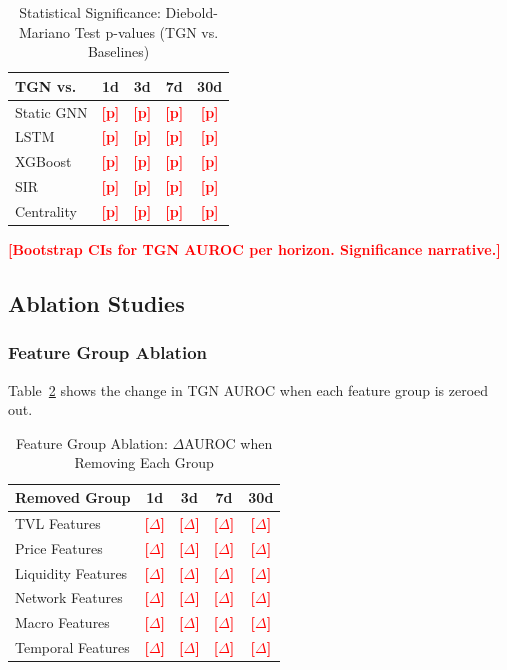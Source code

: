 \documentclass[journal]{IEEEtran}
\newcommand{\TODO}[1]{\textcolor{red}{\textbf{[#1]}}}
\begin{document}
\begin{table}[!t]
\caption{Statistical Significance: Diebold-Mariano Test p-values (TGN vs. Baselines)}
\label{tab:statistical}
\centering
\footnotesize
\begin{tabular}{lcccc}
\toprule
\textbf{TGN vs.} & \textbf{1d} & \textbf{3d} & \textbf{7d} & \textbf{30d} \\
\midrule
Static GNN & \TODO{p} & \TODO{p} & \TODO{p} & \TODO{p} \\
LSTM & \TODO{p} & \TODO{p} & \TODO{p} & \TODO{p} \\
XGBoost & \TODO{p} & \TODO{p} & \TODO{p} & \TODO{p} \\
SIR & \TODO{p} & \TODO{p} & \TODO{p} & \TODO{p} \\
Centrality & \TODO{p} & \TODO{p} & \TODO{p} & \TODO{p} \\
\bottomrule
\end{tabular}
\end{table}

\TODO{Bootstrap CIs for TGN AUROC per horizon. Significance narrative.}

\subsection{Ablation Studies}

\subsubsection{Feature Group Ablation}

Table~\ref{tab:ablation_feat} shows the change in TGN AUROC when each feature group is zeroed out.

\begin{table}[!t]
\caption{Feature Group Ablation: $\Delta$AUROC when Removing Each Group}
\label{tab:ablation_feat}
\centering
\footnotesize
\begin{tabular}{lcccc}
\toprule
\textbf{Removed Group} & \textbf{1d} & \textbf{3d} & \textbf{7d} & \textbf{30d} \\
\midrule
TVL Features & \TODO{$\Delta$} & \TODO{$\Delta$} & \TODO{$\Delta$} & \TODO{$\Delta$} \\
Price Features & \TODO{$\Delta$} & \TODO{$\Delta$} & \TODO{$\Delta$} & \TODO{$\Delta$} \\
Liquidity Features & \TODO{$\Delta$} & \TODO{$\Delta$} & \TODO{$\Delta$} & \TODO{$\Delta$} \\
Network Features & \TODO{$\Delta$} & \TODO{$\Delta$} & \TODO{$\Delta$} & \TODO{$\Delta$} \\
Macro Features & \TODO{$\Delta$} & \TODO{$\Delta$} & \TODO{$\Delta$} & \TODO{$\Delta$} \\
Temporal Features & \TODO{$\Delta$} & \TODO{$\Delta$} & \TODO{$\Delta$} & \TODO{$\Delta$} \\
\bottomrule
\end{tabular}
\end{table}
\end{document}
